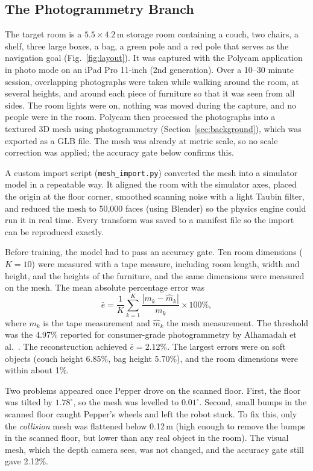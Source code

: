 \subsection{The Photogrammetry Branch}
The target room is a $5.5 \times 4.2$\,m storage room containing a couch, two chairs, a shelf, three
large boxes, a bag, a green pole and a red pole that serves as the navigation goal
(Fig.~\ref{fig:layout}). It was captured with the Polycam application in photo mode on an iPad Pro
11-inch (2nd generation). Over a 10--30 minute session, overlapping photographs were taken while
walking around the room, at several heights, and around each piece of furniture so that it was
seen from all sides. The room lights were on, nothing was moved during the capture, and no
people were in the room. Polycam then processed the photographs into a textured 3D mesh using
photogrammetry (Section~\ref{sec:background}), which was exported as a GLB file. The mesh was
already at metric scale, so no scale correction was applied; the accuracy gate below confirms
this.

A custom import script (\texttt{mesh\_import.py}) converted the mesh into a simulator model in
a repeatable way. It aligned the room with the simulator axes, placed the origin at
the floor corner, smoothed scanning noise with a light Taubin filter, and reduced the mesh to
50{,}000 faces (using Blender) so the physics engine could run it in real time. Every transform was saved to a
manifest file so the import can be reproduced exactly.

Before training, the model had to pass an accuracy gate. Ten room dimensions ($K=10$) were measured
with a tape measure, including room length, width and height, and the heights of the furniture, and
the same dimensions were measured on the mesh. The mean absolute percentage error was
\begin{equation}
\bar{e} = \frac{1}{K}\sum_{k=1}^{K}\frac{|m_k-\hat{m}_k|}{m_k}\times 100\%,
\label{eq:gate}
\end{equation}
where $m_k$ is the tape measurement and $\hat{m}_k$ the mesh measurement. The threshold was the
4.97\% reported for consumer-grade photogrammetry by Alhamadah et al.\
\cite{alhamadah2024photogrammetry}. The reconstruction achieved $\bar{e}=2.12\%$. The largest
errors were on soft objects (couch height 6.85\%, bag height 5.70\%), and the room dimensions
were within about 1\%.

Two problems appeared once Pepper drove on the scanned floor. First, the floor was tilted by
$1.78^\circ$, so the mesh was levelled to $0.01^\circ$. Second, small bumps in the scanned floor
caught Pepper's wheels and left the robot stuck. To fix this, only the \emph{collision} mesh was
flattened below 0.12\,m (high enough to remove the bumps in the scanned floor, but lower than
any real object in the room). The visual mesh, which the depth camera sees, was not changed, and the
accuracy gate still gave 2.12\%.

